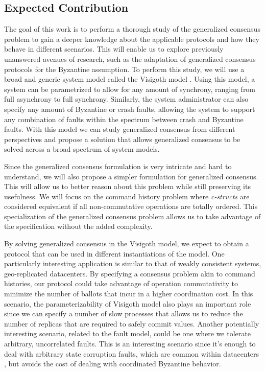 \documentclass[runningheads,a4paper]{llncs}
\begin{document}
\subsection{Expected Contribution}
The goal of this work is to perform a thorough study of the generalized consensus problem to gain a deeper knowledge about the applicable protocols and how they behave in different scenarios. This will enable us to explore previously unanswered avenues of research, such as the adaptation of generalized consensus protocols for the Byzantine assumption. To perform this study, we will use a broad and generic system model called the Visigoth model \cite{Porto2015}. Using this model, a system can be parametrized to allow for any amount of synchrony, ranging from full asynchrony to full synchrony. Similarly, the system administrator can also specify any amount of Byzantine or crash faults, allowing the system to support any combination of faults within the spectrum between crash and Byzantine faults. With this model we can study generalized consensus from different perspectives and propose a solution that allows generalized consensus to be solved across a broad spectrum of system models. \par 
Since the generalized consensus formulation is very intricate and hard to understand, we will also propose a simpler formulation for generalized consensus. This will allow us to better reason about this problem while still preserving its usefulness. We will focus on the command history problem where \textit{c-structs} are considered equivalent if all non-commutative operations are totally ordered. This specialization of the generalized consensus problem allows us to take advantage of the specification without the added complexity. \par
By solving generalized consensus in the Visigoth model, we expect to obtain a protocol that can be used in different instantiations of the model. One particularly interesting application is similar to that of weakly consistent systems, geo-replicated datacenters. By specifying a consensus problem akin to command histories, our protocol could take advantage of operation commutativity to minimize the number of ballots that incur in a higher coordination cost. In this scenario, the parameterizability of Visigoth model also plays an important role since we can specify a number of slow processes that allows us to reduce the number of replicas that are required to safely commit values. Another potentially interesting scenario, related to the fault model, could be one where we tolerate arbitrary, uncorrelated faults. This is an interesting scenario since it's enough to deal with arbitrary state corruption faults, which are common within datacenters \cite{AmazonS32}, but avoids the cost of dealing with coordinated Byzantine behavior.
\end{document}
